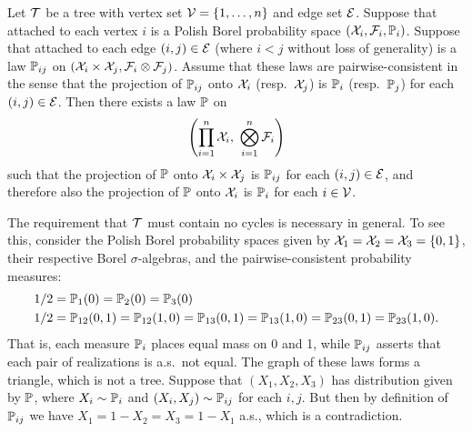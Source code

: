 \begin{lemma}
  \label{lem:vbp}

  Let $\cT$ be a tree
  with vertex set
  $\cV = \{1, \ldots, n\}$
  and edge set $\cE$.
  Suppose that attached to each vertex $i$ is a
  Polish Borel probability space
  $(\cX_i, \cF_i, \P_i)$.
  Suppose that attached to each edge $(i,j) \in \cE$
  (where $i<j$ without loss of generality)
  is a law $\P_{ij}$ on
  $(\cX_i \times \cX_j, \cF_i \otimes \cF_j)$.
  Assume that these laws are pairwise-consistent in the sense that
  the projection of $\P_{ij}$ onto
  $\cX_i$ (resp.\ $\cX_j$) is $\P_i$ (resp.\ $\P_j$)
  for each $(i,j) \in \cE$.
  Then there exists a law $\P$ on
  \begin{align*}
    \left(
      \prod_{i=1}^n \cX_i, \
      \bigotimes_{i=1}^n \cF_i
    \right)
  \end{align*}
  such that the projection of $\P$
  onto $\cX_i \times \cX_j$
  is $\P_{ij}$ for each $(i,j) \in \cE$,
  and therefore also
  the projection of $\P$
  onto $\cX_i$
  is $\P_i$ for each $i \in \cV$.

\end{lemma}

\begin{remark}
  The requirement that $\cT$ must contain no cycles
  is necessary in general.
  To see this, consider the Polish Borel probability spaces
  given by
  $\cX_1 = \cX_2 = \cX_3 = \{0,1\}$,
  their respective Borel $\sigma$-algebras,
  and the pairwise-consistent probability measures:
  \begin{align*}
    1/2
    &=
    \P_1(0) = \P_2(0) = \P_3(0) \\
    1/2
    &=
    \P_{12}(0,1) = \P_{12}(1,0) =
    \P_{13}(0,1) = \P_{13}(1,0) =
    \P_{23}(0,1) = \P_{23}(1,0).
  \end{align*}
  That is, each measure $\P_i$
  places equal mass on 0 and 1,
  while $\P_{ij}$
  asserts that each pair of realizations is a.s.\ not equal.
  The graph of these laws forms a triangle,
  which is not a tree.
  Suppose that $(X_1,X_2,X_3)$ has distribution given by $\P$,
  where $X_i \sim \P_i$ and $(X_i,X_j) \sim \P_{ij}$
  for each $i,j$.
  But then by definition of $\P_{ij}$ we have
  $X_1 = 1-X_2 = X_3 = 1-X_1$ a.s.,
  which is a contradiction.

\end{remark}


